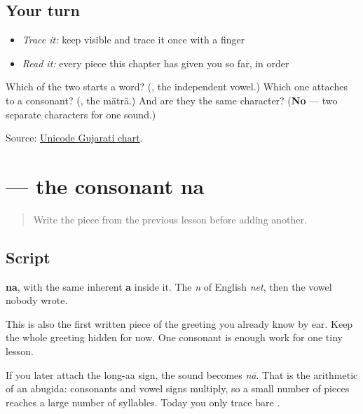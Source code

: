 \subsection*{Your turn}
\begin{itemize}
\raggedright
  \item \emph{Trace it:} keep  visible and trace it once with a finger
  \item \emph{Read it:} every piece this chapter has given you so far, in order
\end{itemize}

\begin{tcolorbox}[breakable,colback=teal!4,colframe=teal!35!black,title={Before you move on}]
Which of the two starts a word? (\textbf{}, the independent vowel.) Which one attaches to a consonant? (\textbf{}, the mātrā.) And are they the same character? (\textbf{No} — two separate characters for one sound.)

Source: \href{https://www.unicode.org/charts/PDF/U0A80.pdf}{Unicode Gujarati chart}.
\end{tcolorbox}
\section[\texorpdfstring{\gu{ન} (na)}{ન (na)}]{ — the consonant na}

\label{lesson:GU-W01-na}



\begin{quote}
Write the piece from the previous lesson before adding another.
\end{quote}

\subsection*{Script}

\begin{quote}
\end{quote}

\textbf{na}, with the same inherent \textbf{a} inside it. The \emph{n} of English \emph{net}, then the vowel nobody wrote.

This is also the first written piece of the greeting you already know by ear. Keep the whole greeting hidden for now. One consonant is enough work for one tiny lesson.

If you later attach the long-aa sign, the sound becomes \emph{nā}. That is the arithmetic of an abugida: consonants and vowel signs multiply, so a small number of pieces reaches a large number of syllables. Today you only trace bare \textbf{}.

